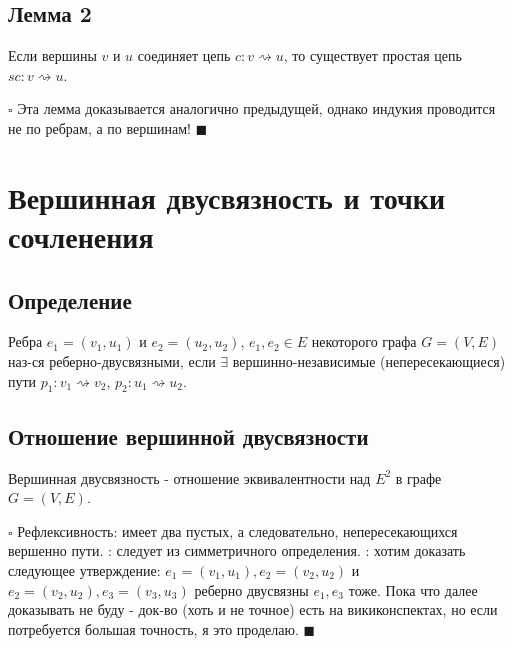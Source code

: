 \documentclass{article}
\begin{document}
\subsection {Лемма 2}

Если вершины \(v\) и \(u\) соединяет цепь \(c: v \rightsquigarrow u\), то существует простая цепь \(sc: v \rightsquigarrow u\).\newline

\(\square\) Эта лемма доказывается аналогично предыдущей, однако индукия проводится не по ребрам, а по вершинам!
\(\blacksquare\)
\newpage
 
 
\section {Вершинная двусвязность и точки сочленения}

\subsection {Определение}
Ребра \(e_1 = (v_1, u_1)\) и \(e_2 = (u_2, u_2)\), \(e_1, e_2 \in E\) некоторого графа \(G = (V, E)\) наз-ся реберно-двусвязными, если \(\exists\) вершинно-независимые (непересекающиеся) пути \(p_1: v_1 \rightsquigarrow v_2\), \(p_2: u_1 \rightsquigarrow u_2\).
\newline

\subsection {Отношение вершинной двусвязности}
Вершинная двусвязность - отношение эквивалентности над \(E^2\) в графе \(G = (V, E)\). \newline

\(\square\)
    Рефлексивность: имеет два пустых, а следовательно, непересекающихся вершенно пути.\newline
    \tab{}: следует из симметричного определения.\newline
    \tab{}: хотим доказать следующее утверждение:\newline
    \(e_1 = (v_1, u_1), e_2 = (v_2, u_2)\) и \(e_2 = (v_2, u_2), e_3 = (v_3, u_3)\) реберно двусвязны \Rightarrow \(e_1, e_3\) тоже.\newline
    Пока что далее доказывать не буду - док-во (хоть и не точное) есть на викиконспектах, но если потребуется большая точность, я это проделаю.
\(\blacksquare\)
\newline
\end{document}
